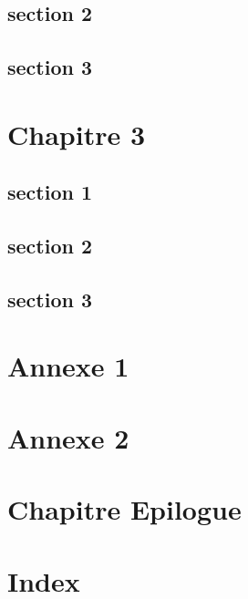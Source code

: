\documentclass[10pt,a4paper]{book}
\begin{document}
\section{section 2}
\section{section 3}
\chapter{Chapitre 3}
\section{section 1}
\section{section 2}
\section{section 3}

\appendix
\chapter{Annexe  1}
\chapter{Annexe  2}

\backmatter
\chapter{Chapitre  Epilogue}
\chapter{Index}
\end{document}
